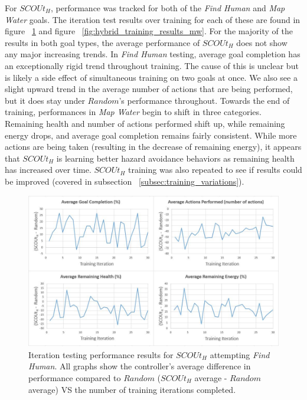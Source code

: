 For $SCOUt_{H}$, performance was tracked for both of the \textit{Find Human} and \textit{Map Water} goals.
The iteration test results over training for each of these are found in figure ~\ref{fig:hybrid_training_results_fh} and figure ~\ref{fig:hybrid_training_results_mw}.
For the majority of the results in both goal types, the average performance of $SCOUt_{H}$ does not show any major increasing trends.
In \textit{Find Human} testing, average goal completion has an exceptionally rigid trend throughout training.
The cause of this is unclear but is likely a side effect of simultaneous training on two goals at once.
We also see a slight upward trend in the average number of actions that are being performed, but it does stay under $Random$'s performance throughout.
Towards the end of training, performances in \textit{Map Water} begin to shift in three categories.
Remaining health and number of actions performed shift up, while remaining energy drops, and average goal completion remains fairly consistent.
While more actions are being taken (resulting in the decrease of remaining energy), it appears that $SCOUt_{H}$ is learning better hazard avoidance behaviors as remaining health has increased over time.
$SCOUt_{H}$ training was also repeated to see if results could be improved (covered in subsection ~\ref{subsec:training_variations}).


\begin{figure}[H]
  \includegraphics[width=1.0\columnwidth]{Figures/Results/Training/SCOUt-Hybrid-FindHuman.JPG}
  \caption{Iteration testing performance results for $SCOUt_{H}$ attempting \textit{Find Human}. All graphs show the controller's average difference in performance compared to $Random$ ($SCOUt_{H}$ average - $Random$ average) VS the number of training iterations completed.}
  \label{fig:hybrid_training_results_fh}
\end{figure}

